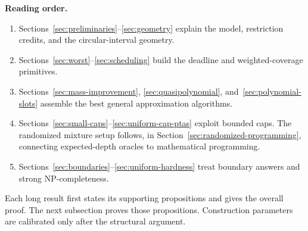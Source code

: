 \begin{proofstrategy}
\textbf{Reading order.}
\begin{enumerate}
\item Sections~\ref{sec:preliminaries}--\ref{sec:geometry} explain the
      model, restriction credits, and the circular-interval geometry.
\item Sections~\ref{sec:worst}--\ref{sec:scheduling} build the
      deadline and weighted-coverage primitives.
\item Sections~\ref{sec:mass-improvement},
      \ref{sec:quasipolynomial}, and~\ref{sec:polynomial-slots}
      assemble the best general approximation algorithms.
\item Sections~\ref{sec:small-caps}--\ref{sec:uniform-cap-ptas}
      exploit bounded caps. The randomized mixture setup follows,
      in Section~\ref{sec:randomized-programming}, connecting
      expected-depth oracles to mathematical programming.
\item Sections~\ref{sec:boundaries}--\ref{sec:uniform-hardness}
      treat boundary answers and strong NP-completeness.
\end{enumerate}
Each long result first states its supporting propositions and gives
the overall proof. The next subsection proves those propositions.
Construction parameters are calibrated only after the structural argument.
\end{proofstrategy}

